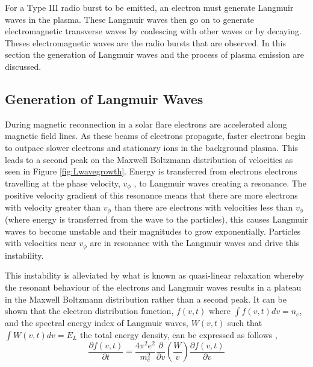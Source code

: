 For a Type III radio burst to be emitted, an electron must generate Langmuir waves in the plasma. These Langmuir waves then go on to generate electromagnetic transverse waves by coalescing with other waves or by decaying. Theses electromagnetic waves are the radio bursts that are observed. In this section the generation of Langmuir waves and the process of plasma emission are discussed.

\subsection{Generation of Langmuir Waves}
During magnetic reconnection in a solar flare electrons are accelerated along magnetic field lines. As these beams of electrons propagate, faster electrons begin to outpace slower electrons and stationary ions in the background plasma. This leads to a second peak on the Maxwell Boltzmann distribution of velocities as seen in Figure \ref{fig:Lwavegrowth}. Energy is transferred from electrons electrons travelling at the phase velocity, $v_{\phi}$ , to Langmuir waves creating a resonance.
The positive velocity gradient of this resonance means that there are more electrons with velocity greater than $v_{\phi}$ than there are electrons with velocities less than  $v_{\phi}$ (where energy is transferred from the wave to the particles), this causes Langmuir waves to become unstable and their magnitudes to grow exponentially. Particles with velocities near $v_{\phi}$ are in resonance with the Langmuir waves and drive this instability.

This instability is alleviated by what is known as quasi-linear relaxation \citep{Melrose1987} whereby the resonant behaviour of the electrons and Langmuir waves results in a plateau in the Maxwell Boltzmann distribution rather than a second peak. It can be shown that \citep{Vedenov1963} the electron distribution function, $f(v,t)$ where $\int f(v,t) dv = n_e$, and the spectral energy index of Langmuir waves, $W(v,t)$ such that $\int W(v,t) dv = E_L$ the total energy density, can be expressed as follows \citep{Reid2014},
\begin{equation}\label{eq:dfdt}
    \frac{\partial f(v,t)}{\partial t}=\frac{4 \pi^2 e^2}{m_e^2} \frac{\partial}{\partial v} \left( \frac{W}{v} \right) \frac{\partial f(v,t)}{\partial v}
\end{equation}

